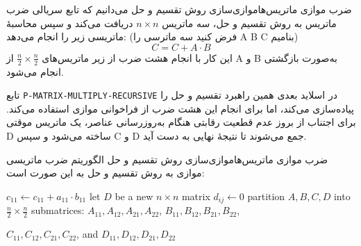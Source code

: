 \begin{itemframe-s}{ضرب موازی ماتریس‌ها}{موازی‌سازی روش تقسیم و حل}
\itm
می‌دانیم که تابع سریالی ضرب ماتریس به روش تقسیم و حل، سه ماتریس
$n \times n$
دریافت می‌کند
و سپس محاسبهٔ ماتریسی زیر را انجام می‌دهد: (فرض کنید سه ماترسی را A B C بنامیم)
$$
C = C + A \cdot B
$$
این کار با انجام هشت ضرب از زیر ماتریس‌های
$\frac{n}{2} \times \frac{n}{2}$
از A و B به‌صورت بازگشتی انجام می‌شود.
\itm

تابع
\texttt{P-MATRIX-MULTIPLY-RECURSIVE}
در اسلاید بعدی همین راهبرد تقسیم‌ و حل را پیاده‌سازی می‌کند، اما برای انجام این هشت ضرب از فراخوانی موازی استفاده می‌کند.
برای اجتناب از بروز عدم قطعیت رقابتی هنگام به‌روزرسانی عناصر، یک ماتریس موقتی D ساخته می‌شود و سپس C و D جمع می‌شوند تا نتیجهٔ نهایی به دست آید.
\end{itemframe-s}


\begin{itemframe-s}{ضرب موازی ماتریس‌ها}{موازی‌سازی روش تقسیم و حل}
\itm
الگوریتم ضرب ماتریسی موازی به روش تقسیم و حل به این صورت است:
 \begin{algorithm}[H]\alglr
\caption{P-MATRIX-MULTIPLY-RECURSIVE}
\begin{algorithmic}[1]
 
    \State $c_{11} \gets c_{11} + a_{11} \cdot b_{11}$
    \State \Return
\EndIf
\State let $D$ be a new $n \times n$ matrix 
        \State $d_{ij} \gets 0$
    \EndFor
\EndFor
\State partition $A, B, C, D$ into $\tfrac{n}{2} \times \tfrac{n}{2}$ submatrices:
\State \hspace{1.5em} $A_{11}, A_{12}, A_{21}, A_{22}$,
$B_{11}, B_{12}, B_{21}, B_{22}$,

\State \hspace{1.5em} $C_{11}, C_{12}, C_{21}, C_{22}$,
and $D_{11}, D_{12}, D_{21}, D_{22}$
\end{algorithmic}
\end{algorithm}

\end{itemframe-s}


